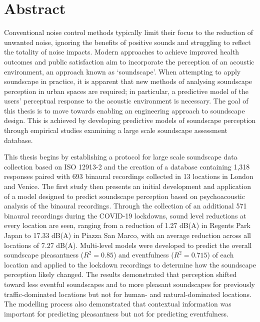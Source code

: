 \documentclass[oneside,fontsize=11pt,titlepage,chapterprefix=true
]{scrbook}
\begin{document}
\chapter*{Abstract}
Conventional noise control methods typically limit their focus to the reduction of unwanted noise, ignoring the benefits of positive sounds and struggling to reflect the totality of noise impacts. Modern approaches to achieve improved health outcomes and public satisfaction aim to incorporate the perception of an acoustic environment, an approach known as `soundscape'. When attempting to apply soundscape in practice, it is apparent that new methods of analysing soundscape perception in urban spaces are required; in particular, a predictive model of the users' perceptual response to the acoustic environment is necessary. The goal of this thesis is to move towards enabling an engineering approach to soundscape design. This is achieved by developing predictive models of soundscape perception through empirical studies examining a large scale soundscape assessment database. 

This thesis begins by establishing a protocol for large scale soundscape data collection based on ISO 12913-2 and the creation of a database containing 1,318 responses paired with 693 binaural recordings collected in 13 locations in London and Venice. The first study then presents an initial development and application of a model designed to predict soundscape perception based on psychoacoustic analysis of the binaural recordings. Through the collection of an additional 571 binaural recordings during the COVID-19 lockdowns, sound level reductions at every location are seen, ranging from a reduction of 1.27 dB(A) in Regents Park Japan to 17.33 dB(A) in Piazza San Marco, with an average reduction across all locations of 7.27 dB(A). Multi-level models were developed to predict the overall soundscape pleasantness ($R^2=0.85$) and eventfulness ($R^2=0.715$) of each location and applied to the lockdown recordings to determine how the soundscape perception likely changed. The results demonstrated that perception shifted toward less eventful soundscapes and to more pleasant soundscapes for previously traffic-dominated locations but not for human- and natural-dominated locations. The modelling process also demonstrated that contextual information was important for predicting pleasantness but not for predicting eventfulness.
\end{document}
